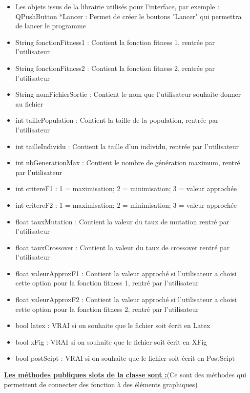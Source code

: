 \documentclass[a4paper,11pt]{article}
\begin{document}
				\begin{itemize}
				\item Les objets issus de la librairie utilisés pour l'interface, par exemple :\\
					QPushButton *Lancer : Permet de créer le boutons "Lancer" qui permettra de lancer le programme\vspace{0.2cm}
				\item String fonctionFitness1 : Contient la fonction fitness 1, rentrée par l'utilisateur
				\item String fonctionFitness2 : Contient la fonction fitness 2, rentrée par l'utilisateur
				\item String nomFichierSortie : Contient le nom que l'utilisateur souhaite donner au fichier
				\item int taillePopulation : Contient la taille de la population, rentrée par l'utilisateur
				\item int tailleIndividu : Contient la taille d'un individu, rentrée par l'utilisateur
				\item int nbGenerationMax : Contient le nombre de génération maximum, rentré par l'utilisateur
				\item int critereF1 : 1  = maximisation; 2 = minimisation; 3 = valeur approchée
				\item int critereF2 : 1  = maximisation; 2 = minimisation; 3 = valeur approchée
				\item float tauxMutation : Contient la valeur du taux de mutation rentré par l'utilisateur
				\item float tauxCrossover : Contient la valeur du taux de crossover rentré par l'utilisateur
				\item float valeurApproxF1 : Contient la valeur approché si l'utilisateur a choisi cette option pour la fonction fitness 1, rentré par l'utilisateur
				\item float valeurApproxF2 : Contient la valeur approché si l'utilisateur a choisi cette option pour la fonction fitness 2, rentré par l'utilisateur
				\item bool latex : VRAI si on souhaite que le fichier soit écrit en Latex
				\item bool xFig : VRAI si on souhaite que le fichier soit écrit en XFig
				\item bool postScipt : VRAI si on souhaite que le fichier soit écrit en PostScipt\\
			\end{itemize}
			\underline{\bf Les méthodes publiques slots de la classe sont :}(Ce sont des méthodes qui permettent de connecter des fonction à des éléments graphiques)\\
\end{document}
